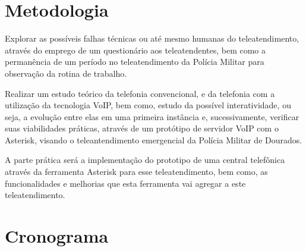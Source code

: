 \section{Metodologia}
Explorar as possíveis falhas técnicas ou até mesmo humanas do teleatendimento, através do emprego de um questionário aos teleatendentes, bem como a permanência de um período no teleatendimento da Polícia Militar para observação da rotina de trabalho.

Realizar um estudo teórico da telefonia convencional, e da telefonia com a utilização da tecnologia VoIP, bem como, estudo da possível interatividade, ou seja, a evolução entre elas em uma primeira instância e, sucessivamente, verificar suas viabilidades práticas, através de um protótipo de servidor VoIP com o Asterisk, visando o teleantendimento emergencial da Polícia Militar de Dourados.

A parte prática será a implementação do prototipo de uma central telefônica através da ferramenta Asterisk para esse teleatendimento, bem como, as funcionalidades e melhorias que esta ferramenta vai agregar a este teleatendimento.  
\newpage
\section{Cronograma}
\thispagestyle{empty}

